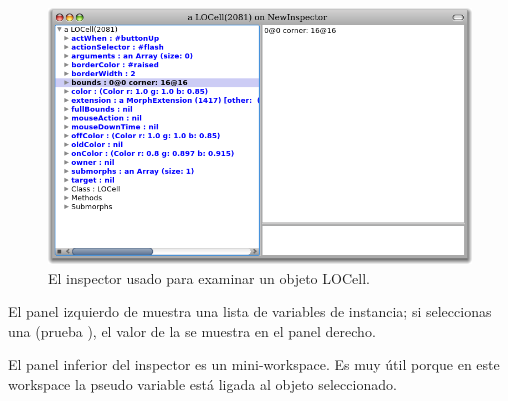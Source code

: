 \documentclass[a4paper,10pt,twoside]{book}
\begin{document}


\begin{figure}[htbp]
   \centering
   \includegraphics[width=\textwidth]{LOCellInspector} 
   \caption{El inspector usado para examinar un objeto LOCell.}
\end{figure}


El panel izquierdo de  muestra una lista de variables de instancia; si seleccionas una (prueba \mbox{}), el valor de la  se muestra en el panel derecho. 


El panel inferior del inspector es un mini-workspace. Es muy útil porque en este workspace la pseudo variable \self está ligada al objeto seleccionado.
\end{document}

